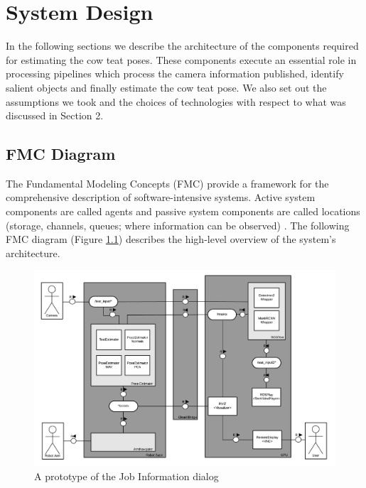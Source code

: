 \chapter{System Design}\label{chap:design}
\label{Background}
\lipsum[1]

In the following sections we describe the architecture of the components required for estimating the cow teat poses. These components execute an essential role in processing pipelines which process the camera information published, identify salient objects and finally estimate the cow teat pose. We also set out the assumptions we took and the choices of technologies with respect to what was discussed in Section 2.

%  
\section{FMC Diagram}
The Fundamental Modeling Concepts (FMC) provide a framework for the comprehensive description of software-intensive systems. 
Active system components are called agents and passive system components are called locations (storage, channels, queues; where information can be observed) \cite{FMCdiag}. The following FMC diagram (Figure \ref{fig:cow_fmc}) describes the high-level overview of the system's architecture.
    \begin{figure}[!ht]
        \centering
        \includegraphics[width=1\textwidth]{images/cow_fmc.png}
        \caption{A prototype of the Job Information dialog}
        \label{fig:cow_fmc}
    \end{figure}
    
